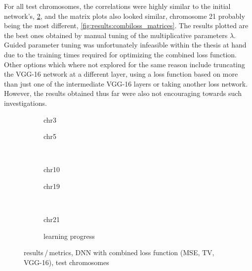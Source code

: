 For all test chromosomes, the correlations were highly similar to the initial network's, \cref{fig:results:combilossDNN_pearson},
and the matrix plots also looked similar, chromosome 21 probably being the most different, \cref{fig:results:combiloss_matrices}.
The results plotted are the best ones obtained by manual tuning of the multiplicative parameters $\lambda$. 
Guided parameter tuning was unfortunately infeasible within the thesis at hand due to the training times required for optimizing the combined loss function.
Other options which where not explored for the same reason include truncating the VGG-16 network at a different layer, using a loss function based on
more than just one of the intermediate VGG-16 layers \cite{Johnson2016} or taking another loss network.
However, the results obtained thus far were also not encouraging towards such investigations.
\begin{figure}[p] %
    \begin{subfigure}{0.45\textwidth}
        \scriptsize
        \caption{chr3}
    \end{subfigure} \hfill
    \begin{subfigure}{0.45\textwidth}
        \scriptsize
        \caption{chr5}
    \end{subfigure}\\[5mm]
    \begin{subfigure}{0.45\textwidth}
        \scriptsize
        \caption{chr10}
    \end{subfigure}\hfill
    \begin{subfigure}{0.45\textwidth}
        \scriptsize
        \caption{chr19}
    \end{subfigure}\\[3mm]
    \centering
    \begin{subfigure}{0.45\textwidth}
        \scriptsize
        \caption{chr21}
    \end{subfigure}\hfill
    \begin{subfigure}{0.45\textwidth}
        \caption{learning progress} \label{fig:results:combilossDNN_lossEpochs}
    \end{subfigure}
    \caption{results\,/\,metrics, DNN with combined loss function (MSE, TV, VGG-16),  test chromosomes}
    \label{fig:results:combilossDNN_pearson}
\end{figure}
